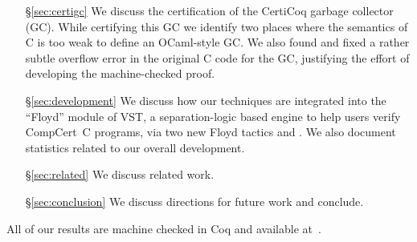 \begin{itemize}
\item[\S\ref{sec:certigc}] We discuss the certification of the CertiCoq garbage collector (GC). While certifying this GC we identify two places where the semantics of C is too weak to define an OCaml-style GC. We also found and fixed a rather subtle overflow error in the original C code for the GC, justifying the effort of developing the machine-checked proof.
\item[\S\ref{sec:development}] We discuss how our techniques are integrated into the
``Floyd'' module of VST, a separation-logic based engine to help users verify
CompCert~C programs, via two new Floyd tactics  and .
We also document statistics related to our overall development.
\item[\S\ref{sec:related}] We discuss related work.
\item[\S\ref{sec:conclusion}] We discuss directions for future work and conclude.
\end{itemize}
All of our results are machine checked in Coq and available at~{\color{magenta}\cite{where}}.
